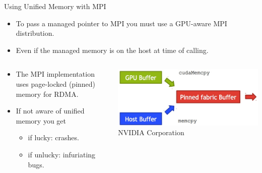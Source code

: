 \documentclass[aspectratio=43]{beamer}
\begin{document}
\begin{frame}[fragile]{Using Unified Memory with MPI}
    \begin{itemize}
        \item To pass a managed pointer to MPI you must use a GPU-aware MPI distribution.
        \item Even if the managed memory is on the host at time of calling.
    \end{itemize}

    \begin{columns}[T]
        \begin{column}{0.5\textwidth}
            \begin{itemize}
                \item The MPI implementation uses page-locked (pinned) memory for RDMA.
                \item If not aware of unified memory you get
                \begin{itemize}
                    \item if lucky: crashes.
                    \item if unlucky: infuriating bugs.
                \end{itemize}
            \end{itemize}
        \end{column}

        \begin{column}{0.5\textwidth}
            \includegraphics[width=\textwidth]{./images/rdmacopy.jpg}\\
            \footnotesize \textcopyright NVIDIA Corporation
        \end{column}
    \end{columns}
\end{frame}
\end{document}
